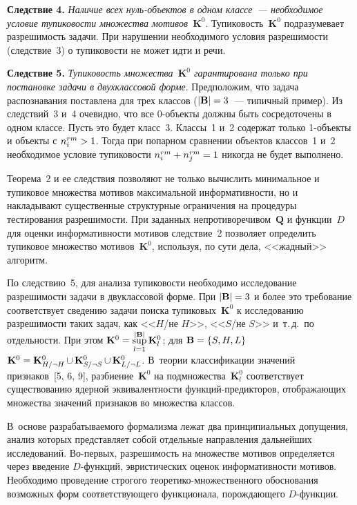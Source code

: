 \begin{multicols}{2}
\medskip

\noindent
\textbf{Следствие 4.}
\textit{Наличие всех нуль-объектов в одном классе~--- необходимое условие
тупиковости множества мотивов~$\mathbf{K}^0$}. Тупиковость~$\mathbf{K}^0$
подразумевает разрешимость задачи. При нарушении необходимого условия
разрешимости (следствие~3) о тупиковости не может идти и речи.

\medskip

\noindent
\textbf{Следствие 5.}
\textit{Тупиковость множества~$\mathbf{K}^0$ гарантирована только при
постановке задачи в двухклассовой форме}. Предположим, что задача
распознавания поставлена для трех классов ($\vert \mathbf{B}\vert \hm=3$~---
типичный пример). Из следствий~3 и~4 очевидно, что все 0-объек\-ты
должны быть сосредоточены в одном классе. Пусть это будет класс~3.
Классы~1 и~2 содержат только 1-объек\-ты и объекты с $n_i^{rm}\hm>1$.
Тогда при попарном сравнении объектов классов~1 и~2 необходимое
условие тупиковости $n_i^{rm}\hm+n_j^{rm}\hm =1$ никогда не будет
выполнено.

\smallskip

Теорема~2 и ее следствия позволяют не только вычислить минимальное и
тупиковое множества мотивов максимальной информативности, но и
накладывают существенные структурные ограничения на процедуры
тестирования разрешимости. При заданных непротиворечивом~$\mathbf{Q}$ и
функции~$D$ для оценки информативности мотивов следствие~2 позволяет
определить тупиковое множество мотивов~$\mathbf{K}^0$, используя, по сути дела,
<<жадный>> алгоритм.

    По следствию~5, для анализа тупиковости необходимо исследование
разрешимости задачи в двуклассовой форме. При $\vert \mathbf{B}\vert\hm = 3$ и
более это требование соответствует сведению задачи поиска\linebreak
тупиковых~$\mathbf{K}^0$ к исследованию разрешимости таких задач, как <<$H$/не
$H$>>, <<$S$/не $S$>> и~т.\,д.\ по от\-дель\-ности. При этом
$\mathbf{K}^0\hm=\sup\limits_{l=1}^{\vert \mathbf{B}\vert} \mathbf{K}_l^0$; для
$\mathbf{B}\hm=\{S, H, L\}$ $\mathbf{K}^0
\hm = \mathbf{K}^0_{H/\neg H}\cupb \mathbf{K}^0_{S/\neg S}\cupb \mathbf{K}^0_{L/\neg L}$. В~теории
классификации значений признаков~[5, 6, 9], разбиение~$\mathbf{K}^0$ на
подмножества~$\mathbf{K}^0_l$ соответствует существованию ядерной
эквивалентности функ\-ций-пре\-дик\-то\-ров, отображающих множества
значений признаков во множества классов.

В~основе разрабатываемого формализма лежат два принципиальных
допущения, анализ которых представляет собой отдельные направления
дальнейших исследований. Во-пер\-вых, разрешимость на множестве мотивов
определяется через введение $D$-функций, эвристических оценок
информативности мотивов. Необходимо проведение строгого
тео\-ре\-ти\-ко-мно\-же\-ст\-вен\-но\-го обоснования возможных форм соответствующего
функционала, по\-рож\-да\-юще\-го $D$-функции.


\end{multicols}
